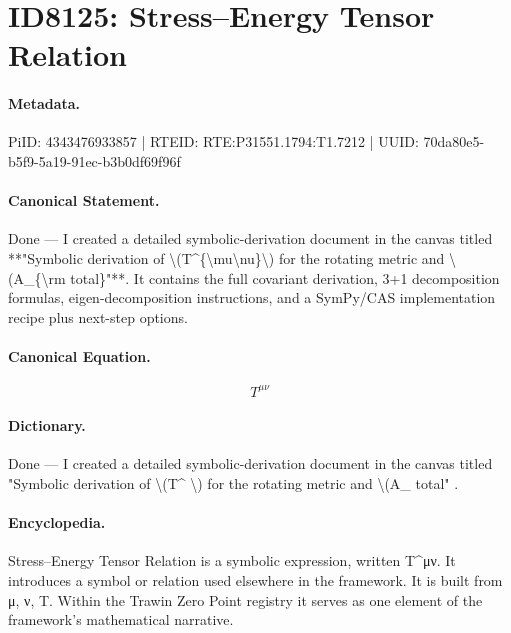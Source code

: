 \section*{ID8125: Stress–Energy Tensor Relation}
\paragraph{Metadata.}
PiID: 4343476933857 | RTEID: RTE:P31551.1794:T1.7212 | UUID: 70da80e5-b5f9-5a19-91ec-b3b0df69f96f

\paragraph{Canonical Statement.}
Done — I created a detailed symbolic-derivation document in the canvas titled **"Symbolic derivation of \textbackslash{}(T\textasciicircum{}\{\textbackslash{}mu\textbackslash{}nu\}\textbackslash{}) for the rotating metric and \textbackslash{}(A\_\{\textbackslash{}rm total\}"**. It contains the full covariant derivation, 3+1 decomposition formulas, eigen-decomposition instructions, and a SymPy/CAS implementation recipe plus next-step options.

\paragraph{Canonical Equation.}
\[
T^{\mu\nu}
\]

\paragraph{Dictionary.}
Done — I created a detailed symbolic-derivation document in the canvas titled "Symbolic derivation of \textbackslash{}(T\textasciicircum{} \textbackslash{}) for the rotating metric and \textbackslash{}(A\_ total" .

\paragraph{Encyclopedia.}
Stress–Energy Tensor Relation is a symbolic expression, written T\textasciicircum{}μν. It introduces a symbol or relation used elsewhere in the framework. It is built from μ, ν, T. Within the Trawin Zero Point registry it serves as one element of the framework's mathematical narrative.
